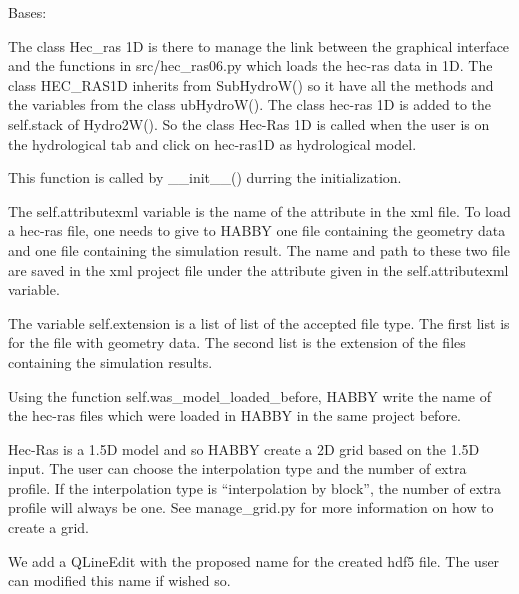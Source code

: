 \documentclass[letterpaper,10pt,english]{sphinxmanual}
\begin{document}
\begin{fulllineitems}
\label{\detokenize{index:src_GUI.hydro_GUI_2.HEC_RAS1D}}
Bases: {\hyperref[\detokenize{index:src_GUI.hydro_GUI_2.SubHydroW}]{}}

The class Hec\_ras 1D is there to manage the link between the graphical interface and the functions in
src/hec\_ras06.py which loads the hec-ras data in 1D. The class HEC\_RAS1D inherits from SubHydroW() so it have all
the methods and the variables from the class ubHydroW(). The class hec-ras 1D is added to the self.stack of Hydro2W().
So the class Hec-Ras 1D is called when the user is on the hydrological tab and click on hec-ras1D as hydrological
model.

\begin{fulllineitems}
\label{\detokenize{index:src_GUI.hydro_GUI_2.HEC_RAS1D.init_iu}}
This function is called by \_\_init\_\_() durring the initialization.


The self.attributexml variable is the name of the attribute in the xml file. To load a hec-ras file, one needs
to give to HABBY one file containing the geometry data and one file containing the simulation result. The name
and path to  these two file are saved in the xml project file under the attribute given in
the self.attributexml variable.

The variable self.extension is a list of list of the accepted file type. The first list is for the file
with geometry data. The second list is the extension of the files containing the simulation results.

Using the function self.was\_model\_loaded\_before, HABBY write the name of the hec-ras files which were loaded
in HABBY in the same project before.

Hec-Ras is a 1.5D model and so HABBY create a 2D grid based on the 1.5D input. The user can choose the interpolation
type and the number of extra profile. If the interpolation type is “interpolation by block”, the number of extra
profile will always be one. See manage\_grid.py for more information on how to create a grid.

We add a QLineEdit with the proposed name for the created hdf5 file. The user can modified this name if wished so.


\end{fulllineitems}
\end{fulllineitems}
\end{document}
